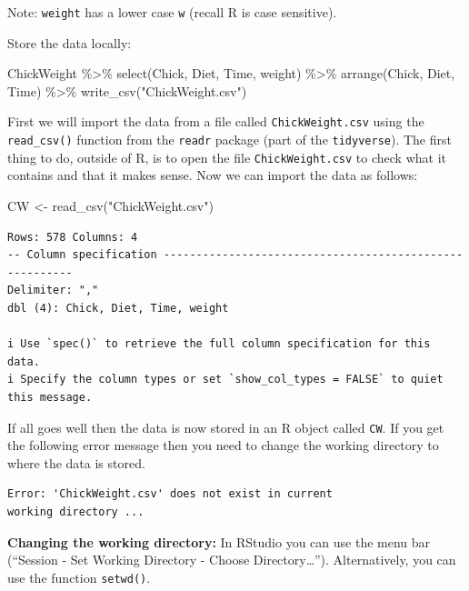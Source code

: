 \documentclass[
  letterpaper,
  DIV=11,
  numbers=noendperiod]{scrreprt}
\newenvironment{Shaded}{\begin{snugshade}}{\end{snugshade}}
\newcommand{\FunctionTok}[1]{\textcolor[rgb]{0.28,0.35,0.67}{#1}}
\newcommand{\NormalTok}[1]{\textcolor[rgb]{0.00,0.23,0.31}{#1}}
\newcommand{\OtherTok}[1]{\textcolor[rgb]{0.00,0.23,0.31}{#1}}
\newcommand{\SpecialCharTok}[1]{\textcolor[rgb]{0.37,0.37,0.37}{#1}}
\newcommand{\StringTok}[1]{\textcolor[rgb]{0.13,0.47,0.30}{#1}}
\theoremstyle{definition}
\theoremstyle{plain}
\theoremstyle{plain}
\theoremstyle{remark}
\begin{document}
Note: \texttt{weight} has a lower case \texttt{w} (recall R is case
sensitive).

Store the data locally:

\begin{Shaded}
\begin{Highlighting}[]
\NormalTok{ChickWeight }\SpecialCharTok{\%\textgreater{}\%}
  \FunctionTok{select}\NormalTok{(Chick, Diet, Time, weight) }\SpecialCharTok{\%\textgreater{}\%} 
  \FunctionTok{arrange}\NormalTok{(Chick, Diet, Time) }\SpecialCharTok{\%\textgreater{}\%} 
  \FunctionTok{write\_csv}\NormalTok{(}\StringTok{"ChickWeight.csv"}\NormalTok{)}
\end{Highlighting}
\end{Shaded}

First we will import the data from a file called
\texttt{ChickWeight.csv} using the \texttt{read\_csv()} function from
the \texttt{readr} package (part of the \texttt{tidyverse}). The first
thing to do, outside of R, is to open the file \texttt{ChickWeight.csv}
to check what it contains and that it makes sense. Now we can import the
data as follows:

\begin{Shaded}
\begin{Highlighting}[]
\NormalTok{CW }\OtherTok{\textless{}{-}} \FunctionTok{read\_csv}\NormalTok{(}\StringTok{"ChickWeight.csv"}\NormalTok{)}
\end{Highlighting}
\end{Shaded}

\begin{verbatim}
Rows: 578 Columns: 4
-- Column specification --------------------------------------------------------
Delimiter: ","
dbl (4): Chick, Diet, Time, weight

i Use `spec()` to retrieve the full column specification for this data.
i Specify the column types or set `show_col_types = FALSE` to quiet this message.
\end{verbatim}

If all goes well then the data is now stored in an R object called
\texttt{CW}. If you get the following error message then you need to
change the working directory to where the data is stored.

\begin{verbatim}
Error: 'ChickWeight.csv' does not exist in current
working directory ...
\end{verbatim}

\textbf{Changing the working directory:} In RStudio you can use the menu
bar (``Session - Set Working Directory - Choose Directory\ldots{}'').
Alternatively, you can use the function \texttt{setwd()}.
\end{document}
